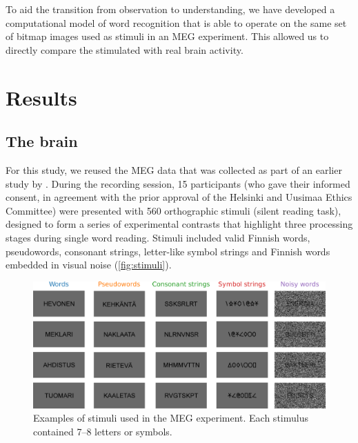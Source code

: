 \documentclass[a4paper, 10pt]{vanvliet_paper}
\begin{document}
To aid the transition from observation to understanding, we have developed a computational model of word recognition that is able to operate on the same set of bitmap images used as stimuli in an \gls{MEG} experiment.
This allowed us to directly compare the stimulated with real brain activity.


\section{Results}

\subsection{The brain}

For this study, we reused the \gls{MEG} data that was collected as part of an earlier study by \textcite{Vartiainen2011}.
During the recording session, 15 participants (who gave their informed consent, in agreement with the prior approval of the Helsinki and Uusimaa Ethics Committee) were presented with 560 orthographic stimuli (silent reading task), designed to form a series of experimental contrasts that highlight three processing stages during single word reading.
Stimuli included valid Finnish words, pseudowords, consonant strings, letter-like symbol strings and Finnish words embedded in visual noise (\autoref{fig:stimuli}).

\begin{figure}
    \includegraphics[width=\textwidth]{stimuli.pdf}
    \caption{Examples of stimuli used in the \gls{MEG} experiment. Each stimulus contained 7--8 letters or symbols.}\label{fig:stimuli}
\end{figure}
\end{document}
